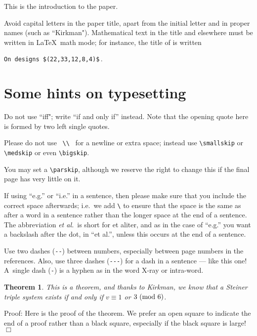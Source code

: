 \documentclass[12pt]{article}
\numberwithin{equation}{section}
\newtheorem{theorem}{Theorem}[section]
\newenvironment*{proof}
{\begin{list}{}{\setlength{\leftmargin}{0em}\setlength{\rightmargin}{0em}}
\item[] {\sc Proof:}} {\hfill$\Box$
\end{list}}
\begin{document}
This is the introduction to the paper.

Avoid capital letters in the paper title, 
apart from the initial letter and in proper names (such as ``Kirkman").
Mathematical text in the title and elsewhere must be written in \LaTeX\ math mode;
for instance, the title of \cite{hall+} is written 
\begin{center}\verb|On designs $(22,33,12,8,4)$|\,.\end{center}


\section{Some hints on typesetting}

Do not use ``iff"; write ``if and only if'' instead.
Note that the opening quote here is formed by two left single quotes.

\smallskip

Please do not use \ \verb|\\| \
for a newline or extra space; instead use
\verb|\smallskip| or 
\verb|\medskip| or even
\verb|\bigskip|.

You may set a \verb|\parskip|, although we reserve the right to change this if
the final page has very little on it.


If using ``e.g.'' or ``i.e.'' in a sentence, then please make sure that
you include the correct space afterwards; i.e.\ we add \verb|\| 
to ensure that the space is the same as after a word in a sentence
rather than the longer space at the end of a sentence.
The abbreviation {\sl et al.}\ is short for et aliter, 
and as in the case of ``e.g.'' you want
a backslash after the dot, in ``et al.'',
unless this occurs at the end of a sentence.

Use two dashes (\verb|--|)  between numbers,
especially between page numbers in the references.
Also, use three dashes (\verb|---|)  for a dash in a sentence --- like this one!
A~single dash (\verb|-|) is a hyphen as in the word X-ray or intra-word.

\begin{theorem} 
This is a theorem, and thanks to Kirkman,
we know that a Steiner triple system exists if and only if $v\equiv 1$ or $3 \ ({\rm mod}\ 6)$.
\end{theorem}

\begin{proof}
Here is the proof of the theorem.
We prefer an open square to indicate the end of a proof rather than a black square, 
especially if the black square is large!
\end{proof}
\end{document}
